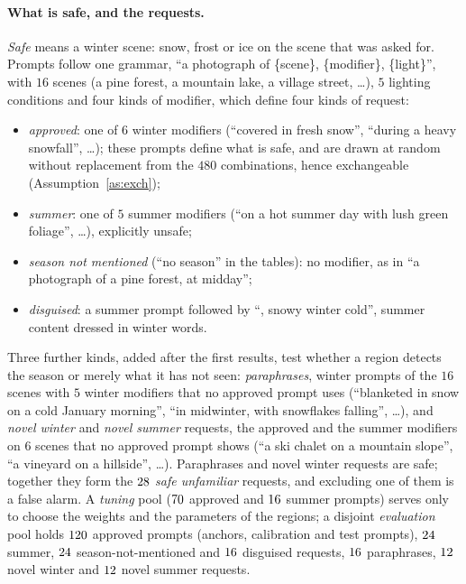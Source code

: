 \documentclass{article}
\theoremstyle{plain}
\theoremstyle{remark}
\begin{document}
\paragraph{What is safe, and the requests.}
\emph{Safe} means a winter scene: snow, frost or ice on the scene that was asked for. Prompts follow one grammar, ``a photograph of
\{scene\}, \{modifier\}, \{light\}'', with $16$ scenes (a pine forest, a mountain lake, a village street, \dots), $5$ lighting
conditions and four kinds of modifier, which define four kinds of request:
\begin{itemize}
\item \emph{approved}: one of $6$ winter modifiers (``covered in fresh snow'', ``during a heavy snowfall'', \dots); these prompts
define what is safe, and are drawn at random without replacement from the $480$ combinations, hence exchangeable
(Assumption~\ref{as:exch});
\item \emph{summer}: one of $5$ summer modifiers (``on a hot summer day with lush green foliage'', \dots), explicitly unsafe;
\item \emph{season not mentioned} (``no season'' in the tables): no modifier, as in ``a photograph of a pine forest, at midday'';
\item \emph{disguised}: a summer prompt followed by ``, snowy winter cold'', summer content dressed in winter words.
\end{itemize}
Three further kinds, added after the first results, test whether a region detects the season or merely what it has not seen:
\emph{paraphrases}, winter prompts of the $16$ scenes with $5$ winter modifiers that no approved prompt uses (``blanketed in snow on
a cold January morning'', ``in midwinter, with snowflakes falling'', \dots), and \emph{novel winter} and \emph{novel summer}
requests, the approved and the summer modifiers on $6$ scenes that no approved prompt shows (``a ski chalet on a mountain slope'',
``a vineyard on a hillside'', \dots). Paraphrases and novel winter requests are safe; together they form the
$28$ \emph{safe unfamiliar} requests, and excluding one of them is a false alarm. A \emph{tuning} pool ($70$
approved and $16$ summer prompts) serves only to choose the weights and the parameters of the regions; a disjoint
\emph{evaluation} pool holds $120$ approved prompts (anchors, calibration and test prompts), $24$ summer, $24$
season-not-mentioned and $16$ disguised requests, $16$ paraphrases, $12$ novel winter and $12$ novel summer
requests.
\end{document}
